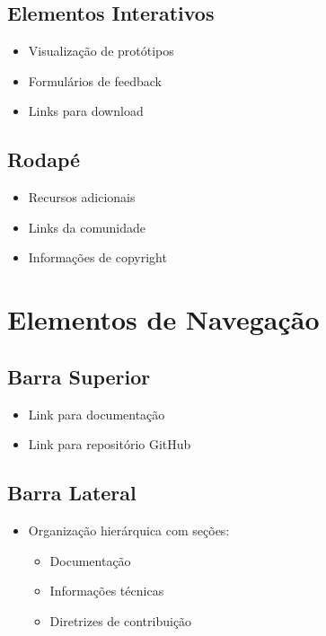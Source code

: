 \subsection{Elementos Interativos}
\begin{itemize}
    \item Visualização de protótipos
    \item Formulários de feedback
    \item Links para download
\end{itemize}

\subsection{Rodapé}
\begin{itemize}
    \item Recursos adicionais
    \item Links da comunidade
    \item Informações de copyright
\end{itemize}

\section{Elementos de Navegação}

\subsection{Barra Superior}
\begin{itemize}
    \item Link para documentação
    \item Link para repositório GitHub
\end{itemize}

\subsection{Barra Lateral}
\begin{itemize}
    \item Organização hierárquica com seções:
    \begin{itemize}
        \item Documentação
        \item Informações técnicas
        \item Diretrizes de contribuição
    \end{itemize}
\end{itemize}

